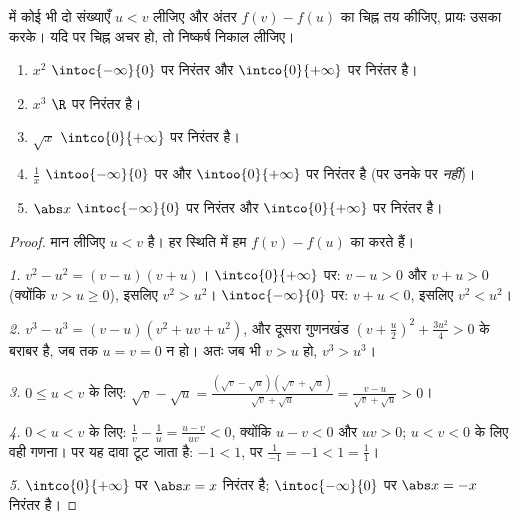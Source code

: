 \begin{method}[परिभाषा से परिवर्तन सिद्ध करना]\label{met:g11:func:variation}
 में कोई भी दो संख्याएँ $u < v$ लीजिए और अंतर $f(v) - f(u)$ का चिह्न तय कीजिए,
प्रायः उसका \emph{} करके। यदि  पर चिह्न अचर हो, तो निष्कर्ष
निकाल लीजिए।
\end{method}

\begin{proposition}[आधार फलनों के परिवर्तन]\label{prop:g11:func:refvariations}
\begin{enumerate}
  \item $x^2$ $\intoc{-\infty}{0}$ पर निरंतर  और $\intco{0}{+\infty}$ पर निरंतर  है।
  \item $x^3$ $\R$ पर निरंतर  है।
  \item $\sqrt x$ $\intco{0}{+\infty}$ पर निरंतर  है।
  \item $\frac1x$ $\intoo{-\infty}{0}$ पर और $\intoo{0}{+\infty}$ पर निरंतर  है (पर उनके  पर
        \emph{नहीं})।
  \item $\abs x$ $\intoc{-\infty}{0}$ पर निरंतर  और $\intco{0}{+\infty}$ पर निरंतर  है।
\end{enumerate}
\end{proposition}

\begin{proof}
मान लीजिए $u < v$ है। हर स्थिति में हम $f(v) - f(u)$ का  करते हैं।

\emph{1.} $v^2 - u^2 = (v-u)(v+u)$। $\intco{0}{+\infty}$ पर: $v - u > 0$ और $v + u > 0$ (क्योंकि $v > u \geq 0$), इसलिए $v^2 > u^2$। $\intoc{-\infty}{0}$ पर:
$v + u < 0$, इसलिए $v^2 < u^2$।

\emph{2.} $v^3 - u^3 = (v - u)(v^2 + uv + u^2)$, और दूसरा गुणनखंड $\left(v + \frac u2\right)^2 + \frac{3u^2}{4} > 0$ के बराबर है, जब तक $u = v = 0$ न हो। अतः
जब भी $v > u$ हो, $v^3 > u^3$।

\emph{3.} $0 \leq u < v$ के लिए: $\sqrt v - \sqrt u = \frac{(\sqrt v - \sqrt u)(\sqrt v + \sqrt u)}
{\sqrt v + \sqrt u} = \frac{v - u}{\sqrt v + \sqrt u} > 0$।

\emph{4.} $0 < u < v$ के लिए: $\frac1v - \frac1u = \frac{u - v}{uv} < 0$, क्योंकि $u - v < 0$ और $uv > 0$; $u < v < 0$ के लिए वही गणना।
 पर यह दावा टूट जाता है: $-1 < 1$, पर $\frac{1}{-1} = -1 < 1 = \frac11$।

\emph{5.} $\intco{0}{+\infty}$ पर $\abs x = x$ निरंतर  है; $\intoc{-\infty}{0}$ पर $\abs x = -x$ निरंतर  है।
\end{proof}

